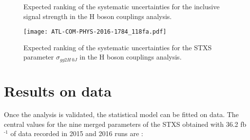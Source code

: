 \begin{enumerate}
\begin{figure}[htbp]
\caption{\label{fig:org36c582d}
Expected ranking of the systematic uncertainties for the inclusive signal strength in the H boson couplings analysis.\cite{ATL-COM-PHYS-2016-1784}}
\end{figure}

\begin{figure}[htbp]
\centering
\texttt{[image: ATL-COM-PHYS-2016-1784\_118fa.pdf]}\\
\caption{\label{fig:HGam_ranking_STXS}
Expected ranking of the systematic uncertainties for the STXS parameter $\sigma_{gg2H\ 0J}$ in the H boson couplings analysis.\cite{ATL-COM-PHYS-2016-1784}}
\end{figure}


\end{enumerate}



\section{Results on data}
\label{sec:orgf375a30}

Once the analysis is validated, the statistical model can be fitted on data.
The central values for the nine merged parameters of the STXS obtained with 36.2 fb\(^{\text{-1}}\) of data recorded in 2015 and 2016 runs are \cite{ATLAS-CONF-2017-045}:


